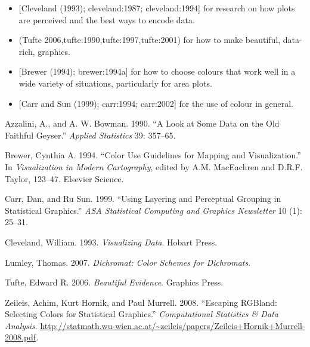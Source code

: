 \begin{itemize}
\itemsep1pt\parskip0pt
\item
  {[}Cleveland (1993); cleveland:1987; cleveland:1994{]} for research on
  how plots are perceived and the best ways to encode data.
\item
  (Tufte 2006,tufte:1990,tufte:1997,tufte:2001) for how to make
  beautiful, data-rich, graphics.
\item
  {[}Brewer (1994); brewer:1994a{]} for how to choose colours that work
  well in a wide variety of situations, particularly for area plots.
\item
  {[}Carr and Sun (1999); carr:1994; carr:2002{]} for the use of colour
  in general.
\end{itemize}

Azzalini, A., and A. W. Bowman. 1990. ``A Look at Some Data on the Old
Faithful Geyser.'' \emph{Applied Statistics} 39: 357--65.

Brewer, Cynthia A. 1994. ``Color Use Guidelines for Mapping and
Visualization.'' In \emph{Visualization in Modern Cartography}, edited
by A.M. MacEachren and D.R.F. Taylor, 123--47. Elsevier Science.

Carr, Dan, and Ru Sun. 1999. ``Using Layering and Perceptual Grouping in
Statistical Graphics.'' \emph{ASA Statistical Computing and Graphics
Newsletter} 10 (1): 25--31.

Cleveland, William. 1993. \emph{Visualizing Data}. Hobart Press.

Lumley, Thomas. 2007. \emph{Dichromat: Color Schemes for Dichromats}.

Tufte, Edward R. 2006. \emph{Beautiful Evidence}. Graphics Press.

Zeileis, Achim, Kurt Hornik, and Paul Murrell. 2008. ``Escaping RGBland:
Selecting Colors for Statistical Graphics.'' \emph{Computational
Statistics \& Data Analysis}.
\url{http://statmath.wu-wien.ac.at/~zeileis/papers/Zeileis+Hornik+Murrell-2008.pdf}.

